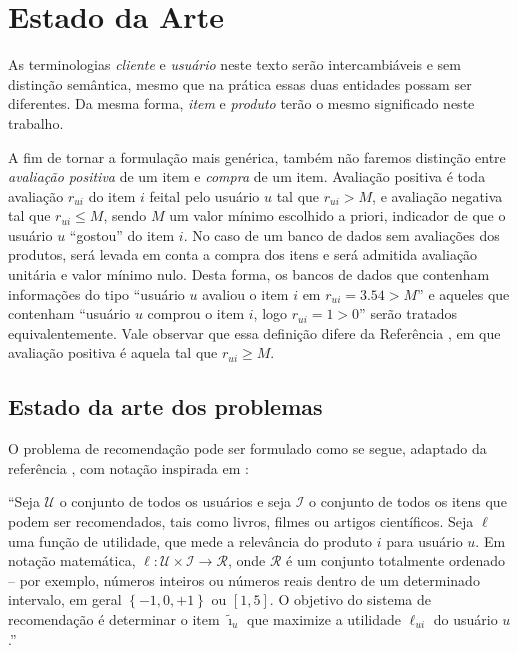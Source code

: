 \chapter[Estado da arte]{Estado da Arte}
\label{chap:estado_da_arte}

As terminologias \textit{cliente} e \textit{usuário} neste texto serão intercambiáveis e sem distinção semântica, mesmo que na prática essas duas entidades possam ser diferentes. Da mesma forma, \textit{item} e \textit{produto} terão o mesmo significado neste trabalho. 

A fim de tornar a formulação mais genérica, também não faremos distinção entre \textit{avaliação positiva} de um item e \textit{compra} de um item. Avaliação positiva é toda avaliação $r_{ui}$ do item $i$ feital pelo usuário $u$ tal que $r_{ui} > M$, e avaliação negativa tal que $r_{ui} \leq M$, sendo $M$ um valor mínimo escolhido a priori, indicador de que o usuário $u$ ``gostou'' do item $i$. No caso de um banco de dados sem avaliações dos produtos, será levada em conta a compra dos itens e será admitida avaliação unitária e valor mínimo nulo. Desta forma, os bancos de dados que contenham informações do tipo ``usuário $u$ avaliou o item $i$ em $r_{ui} = 3.54 > M$'' e aqueles que contenham ``usuário $u$ comprou o item $i$, logo $r_{ui} = 1 > 0$'' serão tratados equivalentemente. Vale observar que essa definição difere da Referência , em que avaliação positiva é aquela tal que $r_{ui} \geq M$.

\section{Estado da arte dos problemas} %
\label{sec:estado_da_arte_dos_problemas}

O problema de recomendação pode ser formulado como se segue, adaptado da referência \cite{adomavicius2005toward}, com notação inspirada em \cite{symeonidis2007feature}: 

``Seja $\mathcal{U}$ o conjunto de todos os usuários e seja $\mathcal{I}$ o conjunto de todos os itens que podem ser recomendados, tais como livros, filmes ou artigos científicos. Seja $\ell$ uma função de utilidade, que mede a relevância do produto $i$ para usuário $u$. Em notação matemática, $\ell: \mathcal{U} \times \mathcal{I} \rightarrow \mathcal{R}$, onde $\mathcal{R}$ é um  conjunto totalmente ordenado -- por exemplo, números inteiros ou números reais dentro de um determinado intervalo, em geral $\left\{-1, 0, +1\right\}$ ou $[1, 5]$. O objetivo do sistema de recomendação é determinar o item $\tilde{\imath}_u$ que maximize a utilidade $\ell_{ui}$ do usuário $u$.''

